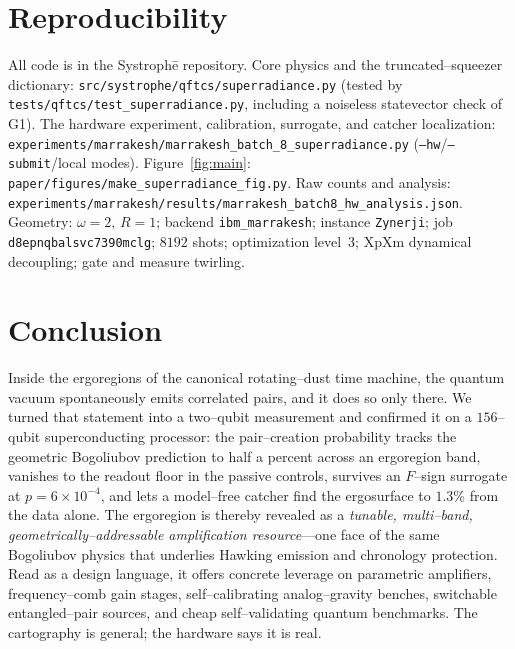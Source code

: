 \documentclass[11pt]{article}
\newcommand{\code}[1]{\texttt{\small #1}}
\begin{document}
\section{Reproducibility}
\label{sec:repro}

All code is in the Systroph\=e repository. Core physics and the truncated--squeezer dictionary:
\code{src/systrophe/qftcs/superradiance.py} (tested by
\code{tests/qftcs/test\_superradiance.py}, including a noiseless statevector check of G1).
The hardware experiment, calibration, surrogate, and catcher localization:
\code{experiments/marrakesh/marrakesh\_batch\_8\_superradiance.py}
(\code{--hw}/\code{--submit}/local modes). Figure~\ref{fig:main}:
\code{paper/figures/make\_superradiance\_fig.py}. Raw counts and analysis:
\code{experiments/marrakesh/results/marrakesh\_batch8\_hw\_analysis.json}. Geometry:
$\omega=2,\,R=1$; backend \code{ibm\_marrakesh}; instance \code{Zynerji}; job
\code{d8epnqbalsvc7390mclg}; $8192$ shots; optimization level~3; XpXm dynamical decoupling; gate
and measure twirling.

\section{Conclusion}

Inside the ergoregions of the canonical rotating--dust time machine, the quantum vacuum
spontaneously emits correlated pairs, and it does so only there. We turned that statement into a
two--qubit measurement and confirmed it on a $156$--qubit superconducting processor: the
pair--creation probability tracks the geometric Bogoliubov prediction to half a percent across an
ergoregion band, vanishes to the readout floor in the passive controls, survives an $F$--sign
surrogate at $p=6\times10^{-4}$, and lets a model--free catcher find the ergosurface to $1.3\%$
from the data alone. The ergoregion is thereby revealed as a \emph{tunable, multi--band,
geometrically--addressable amplification resource}---one face of the same Bogoliubov physics that
underlies Hawking emission and chronology protection. Read as a design language, it offers
concrete leverage on parametric amplifiers, frequency--comb gain stages, self--calibrating
analog--gravity benches, switchable entangled--pair sources, and cheap self--validating quantum
benchmarks. The cartography is general; the hardware says it is real.
\end{document}
